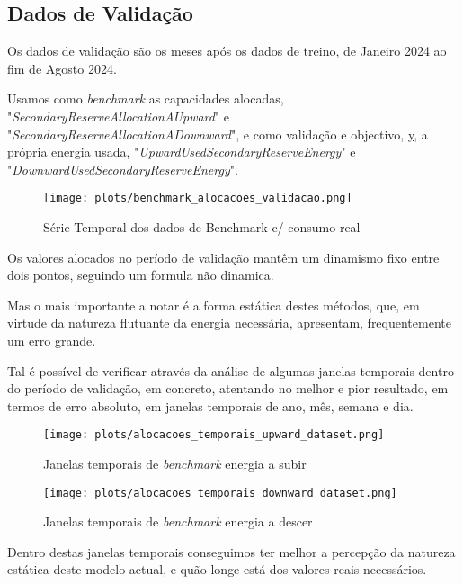 \subsection{Dados de Validação}
Os dados de validação são os meses após os dados de treino, de Janeiro 2024 ao fim de Agosto 2024.\par
Usamos como \textit{benchmark} as capacidades alocadas, "\textit{SecondaryReserveAllocationAUpward}" e "\textit{SecondaryReserveAllocationADownward}", e como validação e objectivo, \hyperref[se:metneuralnet]{y}, a própria energia usada, "\textit{UpwardUsedSecondaryReserveEnergy}" e "\textit{DownwardUsedSecondaryReserveEnergy}".

\begin{figure}[H]
    \centering
    \texttt{[image: plots/benchmark\_alocacoes\_validacao.png]}
    \caption{Série Temporal dos dados de Benchmark c/ consumo real}
    \label{fig:benchmarktimeseries}
\end{figure}

Os valores alocados no período de validação mantêm um dinamismo fixo entre dois pontos, seguindo um formula não dinamica. \par
Mas o mais importante a notar é a forma estática destes métodos, que, em virtude da natureza flutuante da energia necessária, apresentam, frequentemente um erro grande.\par
Tal é possível de verificar através da análise de algumas janelas temporais dentro do período de validação, em concreto, atentando no melhor e pior resultado, em termos de erro absoluto, em janelas temporais de ano, mês, semana e dia.\par


\begin{figure}[H]
    \centering
    \texttt{[image: plots/alocacoes\_temporais\_upward\_dataset.png]}
    \caption{Janelas temporais de \textit{benchmark} energia a subir}
    \label{fig:benchmarktimewindowsup}
\end{figure}


\begin{figure}[H]
    \centering
    \texttt{[image: plots/alocacoes\_temporais\_downward\_dataset.png]}
    \caption{Janelas temporais de \textit{benchmark} energia a descer}
    \label{fig:benchmarktimewindowsdown}
\end{figure}

Dentro destas janelas temporais conseguimos ter melhor a percepção da natureza estática deste modelo actual, e quão longe está dos valores reais necessários.\par

